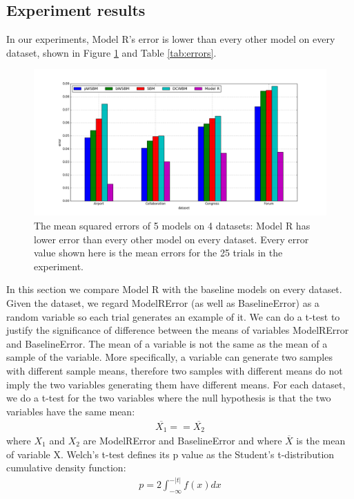 \documentclass[conference]{IEEEtran}
\begin{document}
\subsection{Experiment results}
In our experiments,
Model R's error is lower than every other model on every dataset,
shown in Figure \ref{fig:errors} and Table \ref{tab:errors}.
\begin{figure}[!htb]\centering
	\includegraphics[width=1\textwidth]{link-weight-errors}
	\caption{
		The mean squared errors of 5 models on 4 datasets:
		Model R has lower error than every other model on every dataset.
		Every error value shown here is the mean errors for the 25 trials in the experiment.
	}
	\label{fig:errors}
\end{figure}
In this section we compare Model R with the baseline models on every dataset.
Given the dataset,
we regard ModelRError (as well as BaselineError) as a random variable
so each trial generates an example of it.
We can do a t-test to justify the significance of difference between the means of variables ModelRError and BaselineError.
The mean of a variable is not the same as the mean of a sample of the variable.
More specifically, a variable can generate two samples with different sample means,
therefore two samples with different means do not imply the two variables generating them have different means.
For each dataset, we do a t-test for the two variables where the null hypothesis is that the two variables have the same mean:
\begin{align*}
\overline{X_1} == \overline{X_2}
\end{align*}
where $ X_1 $ and $ X_2 $ are ModelRError and BaselineError and
where $ \overline{X} $ is the mean of variable X.
Welch's t-test defines its p value as the Student's t-distribution cumulative density function:
\begin{align*}
p = 2 \int_{-\infty}^{-|t|} f(x) dx
\end{align*}
\end{document}
